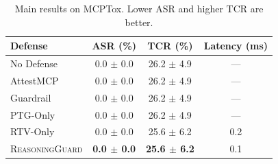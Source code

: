 \begin{table}[t]
\centering
\small
\begin{tabular}{lccc}
\toprule
Defense & ASR (\%) & TCR (\%) & Latency (ms) \\
\midrule
No Defense & 0.0 $\pm$ 0.0 & 26.2 $\pm$ 4.9 & --- \\
AttestMCP & 0.0 $\pm$ 0.0 & 26.2 $\pm$ 4.9 & --- \\
Guardrail & 0.0 $\pm$ 0.0 & 26.2 $\pm$ 4.9 & --- \\
PTG-Only & 0.0 $\pm$ 0.0 & 26.2 $\pm$ 4.9 & --- \\
RTV-Only & 0.0 $\pm$ 0.0 & 25.6 $\pm$ 6.2 & 0.2 \\
\textsc{ReasoningGuard} & \textbf{0.0 $\pm$ 0.0} & \textbf{25.6 $\pm$ 6.2} & 0.1 \\
\bottomrule
\end{tabular}
\caption{Main results on MCPTox. Lower ASR and higher TCR are better.}
\label{tab:main}
\end{table}
